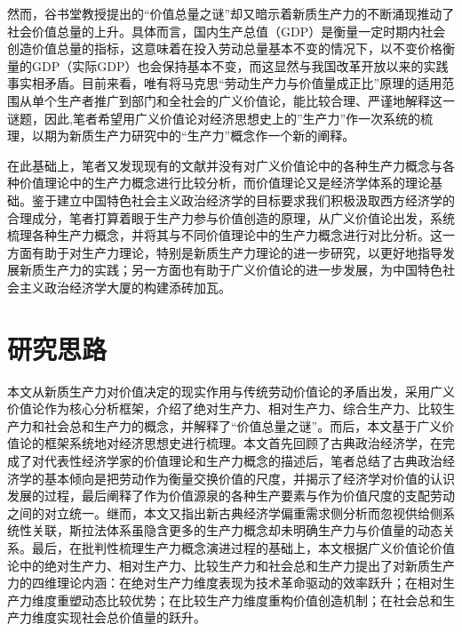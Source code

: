 然而，谷书堂教授提出的“价值总量之谜”\cite[6-7]{GuShuTangQiuJieJieZhiZongLiangZhiMiLiangTiaoSiLuDeBiJiao2002}却又暗示着新质生产力的不断涌现推动了社会价值总量的上升。具体而言，国内生产总值（GDP）是衡量一定时期内社会创造价值总量的指标\cite[659]{BaoLuo*SaMouErSenJingJiXueDiShiJiuBan2012}，这意味着在投入劳动总量基本不变的情况下，以不变价格衡量的GDP（实际GDP）也会保持基本不变，而这显然与我国改革开放以来的实践事实相矛盾。目前来看，唯有将马克思“劳动生产力与价值量成正比”原理的适用范围从单个生产者推广到部门和全社会的广义价值论，能比较合理、严谨地解释这一谜题\cite{CaiJiMingJiShuJinBuJingJiZengChangYuJieZhiZongLiangZhiMiJiYuGuangYiJieZhiLunDeJieShi2019}，因此,笔者希望用广义价值论对经济思想史上的”生产力”作一次系统的梳理，以期为新质生产力研究中的“生产力”概念作一个新的阐释。

在此基础上，笔者又发现现有的文献并没有对广义价值论中的各种生产力概念与各种价值理论中的生产力概念进行比较分析，而价值理论又是经济学体系的理论基础\cite[118]{CaiJiMingCongGuDianZhengZhiJingJiXueDaoZhongGuoTeSeSheHuiZhuYiZhengZhiJingJiXueJiYuZhongGuoShiJiaoDeZhengZhiJingJiXueYanBianShangCe2023}。鉴于建立中国特色社会主义政治经济学的目标要求我们积极汲取西方经济学的合理成分\cite[81]{ChengEnFuChongJianZhongGuoJingJiXueChaoYueMaKeSiYuXiFangJingJiXue2000}，笔者打算着眼于生产力参与价值创造的原理，从广义价值论出发，系统梳理各种生产力概念，并将其与不同价值理论中的生产力概念进行对比分析。这一方面有助于对生产力理论，特别是新质生产力理论的进一步研究，以更好地指导发展新质生产力的实践；另一方面也有助于广义价值论的进一步发展，为中国特色社会主义政治经济学大厦的构建添砖加瓦。


\section{研究思路}

本文从新质生产力对价值决定的现实作用与传统劳动价值论的矛盾出发，采用广义价值论作为核心分析框架，介绍了绝对生产力、相对生产力、综合生产力、比较生产力和社会总和生产力的概念，并解释了“价值总量之谜”。而后，本文基于广义价值论的框架系统地对经济思想史进行梳理。本文首先回顾了古典政治经济学，在完成了对代表性经济学家的价值理论和生产力概念的描述后，笔者总结了古典政治经济学的基本倾向是把劳动作为衡量交换价值的尺度，并揭示了经济学对价值的认识发展的过程，最后阐释了作为价值源泉的各种生产要素与作为价值尺度的支配劳动之间的对立统一。继而，本文又指出新古典经济学偏重需求侧分析而忽视供给侧系统性关联，斯拉法体系虽隐含更多的生产力概念却未明确生产力与价值量的动态关系。最后，在批判性梳理生产力概念演进过程的基础上，本文根据广义价值论价值论中的绝对生产力、相对生产力、比较生产力和社会总和生产力提出了对新质生产力的四维理论内涵：在绝对生产力维度表现为技术革命驱动的效率跃升；在相对生产力维度重塑动态比较优势；在比较生产力维度重构价值创造机制；在社会总和生产力维度实现社会总价值量的跃升。

